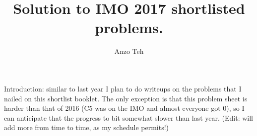 \documentclass[11pt,a4paper]{article}
\begin{document}
\newcommand{\la}{\leftarrow}
\newcommand{\lra}{\leftrightarrow}
\newcommand{\bbR}{\mathbb{R}}
\newcommand{\bbN}{\mathbb{N}}
\newcommand{\ord}{\text{ord}}

\title{Solution to IMO 2017 shortlisted problems.}
\author{Anzo Teh}
\date{}
\maketitle

Introduction: similar to last year I plan to do writeups on the problems that I nailed on this shortlist booklet. The only exception is that this problem sheet is harder than that of 2016 (C5 was on the IMO and almost everyone got 0), so I can anticipate that the progress to bit somewhat slower than last year. (Edit: will add more from time to time, as my schedule permits!)


\iffalse
TODO: 


A6: 
Let $\mathbb{R}$ be the set of real numbers. Determine all functions $f: \mathbb{R} \rightarrow \mathbb{R}$ such that, for any real numbers $x$ and $y$,\[ f(f(x)f(y)) + f(x+y) = f(xy). \]

C4: 
An integer $N \ge 2$ is given. A collection of $N(N + 1)$ soccer players, no two of whom are of the same height, stand in a row. Sir Alex wants to remove $N(N - 1)$ players from this row leaving a new row of $2N$ players in which the following $N$ conditions hold:
($1$) no one stands between the two tallest players,
($2$) no one stands between the third and fourth tallest players,
$\;\;\vdots$
($N$) no one stands between the two shortest players.

Show that this is always possible.

G6: 
Let $n\ge3$ be an integer. Two regular $n$-gons $\mathcal{A}$ and $\mathcal{B}$ are given in the plane. Prove that the vertices of $\mathcal{A}$ that lie inside $\mathcal{B}$ or on its boundary are consecutive.

(That is, prove that there exists a line separating those vertices of $\mathcal{A}$ that lie inside $\mathcal{B}$ or on its boundary from the other vertices of $\mathcal{A}$.)

N6: 
Find the smallest positive integer $n$ or show no such $n$ exists, with the following property: there are infinitely many distinct $n$-tuples of positive rational numbers $(a_1, a_2, \ldots, a_n)$ such that both
$$a_1+a_2+\dots +a_n \quad \text{and} \quad \frac{1}{a_1} + \frac{1}{a_2} + \dots + \frac{1}{a_n}$$are integers.
\fi
\end{document}
